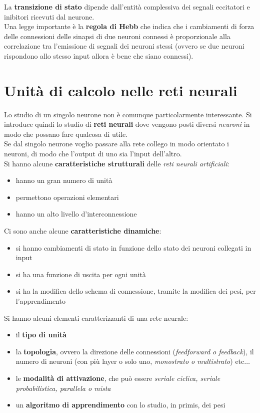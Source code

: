 La \textbf{transizione di stato} dipende dall'entità complessiva dei segnali
eccitatori e inibitori ricevuti dal neurone.\\
Una legge importante è la \textbf{regola di Hebb} che indica che i cambiamenti
di forza delle connessioni delle sinapsi di due neuroni connessi è proporzionale
alla correlazione tra l'emissione di segnali dei neuroni stessi (ovvero se due
neuroni rispondono allo stesso input allora è bene che siano connessi).
\section{Unità di calcolo nelle reti neurali}
Lo studio di un singolo neurone non è comunque particolarmente interessante. Si
introduce quindi lo studio di \textbf{reti neurali} dove vengono posti diversi
\textit{neuroni} in modo che possano fare qualcosa di utile.\\
Se dal singolo neurone voglio passare alla rete collego in modo orientato i
neuroni, di modo che l'output di uno sia l'input dell'altro. \\
Si hanno alcune \textbf{caratteristiche strutturali} delle \textit{reti neurali
artificiali}:
\begin{itemize}
	\item hanno un gran numero di unità
	\item permettono operazioni elementari
	\item hanno un alto livello d'interconnessione
\end{itemize}
Ci sono anche alcune \textbf{caratteristiche dinamiche}:
\begin{itemize}
	\item si hanno cambiamenti di stato in funzione dello stato dei neuroni
	      collegati in input
	\item si ha una funzione di uscita per ogni unità
	\item si ha la modifica dello schema di connessione, tramite la modifica dei
	      pesi, per l'apprendimento
\end{itemize}
Si hanno alcuni elementi caratterizzanti di una rete neurale:
\begin{itemize}
	\item il \textbf{tipo di unità}
	\item la \textbf{topologia}, ovvero la direzione delle connessioni
	      (\textit{feedforward \textnormal{o} feedback}), il numero di neuroni (con più
	      layer o solo uno, \textit{monostrato \textnormal{o} multistrato}) etc$\ldots$
	\item le \textbf{modalità di attivazione}, che può essere \textit{seriale
		ciclica, seriale probabilistica, parallela \textnormal{o} mista}
	\item un \textbf{algoritmo di apprendimento} con lo studio, in primis, dei
	      pesi
\end{itemize}
\newpage


